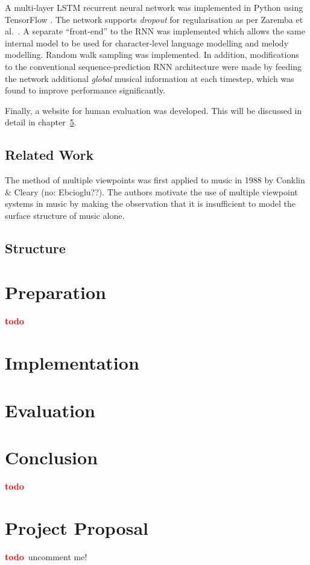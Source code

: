 \documentclass[12pt,a4paper,twoside,openright]{report}
\newcommand{\todo}{\textcolor{red}{\textbf{todo}~}}
\begin{document}
A multi-layer LSTM recurrent neural network was implemented in Python using
TensorFlow \cite{abadi2016tensorflow}. The network supports \emph{dropout} for
regularisation as per Zaremba et al.\ \cite{zaremba2014recurrent}. A separate
``front-end'' to the RNN was implemented which allows the same internal model to
be used for character-level language modelling and melody modelling. Random walk
sampling was implemented. In addition, modifications to the conventional
sequence-prediction RNN architecture were made by feeding the network additional
\emph{global} musical information at each timestep, which was found to improve
performance significantly.

Finally, a website for human evaluation was developed. This will be discussed in
detail in chapter~\ref{chap:eval}.

\section{Related Work}

The method of multiple viewpoints was first applied to music in 1988 by Conklin
\& Cleary \cite{conklin1988modelling} (no: Ebcioglu??). The authors motivate the use of multiple
viewpoint systems in music by making the observation that it is insufficient to
model the surface structure of music alone.

\section{Structure}

\chapter{Preparation}

\todo

\chapter{Implementation}

\chapter{Evaluation}\label{chap:eval}


\chapter{Conclusion}

\todo
\printbibliography

\appendix

\chapter{Project Proposal}

\todo uncomment me!
%
\end{document}
